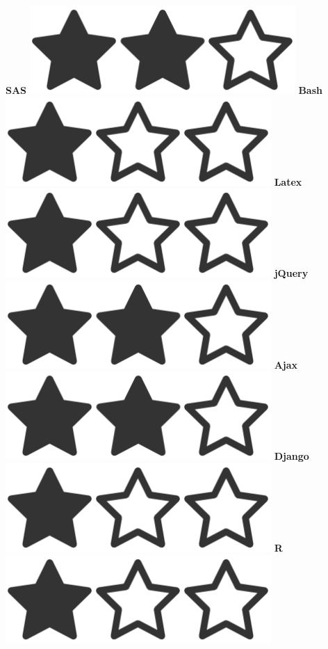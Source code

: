 \documentclass[]{friggeri-cv}
\begin{document}
\begin{aside}
    \textbf{SAS  }\includegraphics[scale=0.07]{img/2heart.png}
    \textbf{Bash  }\includegraphics[scale=0.07]{img/1heart.png}  
    \textbf{Latex  }\includegraphics[scale=0.07]{img/1heart.png}
    \textbf{jQuery  }\includegraphics[scale=0.07]{img/2heart.png}
    \textbf{Ajax  }\includegraphics[scale=0.07]{img/2heart.png}  
    \textbf{Django  }\includegraphics[scale=0.07]{img/1heart.png}
    \textbf{R  }\includegraphics[scale=0.07]{img/1heart.png}
    ~

\end{aside}
\end{document}
